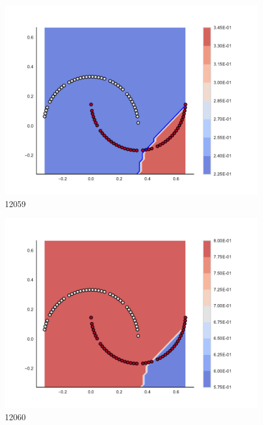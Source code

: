 \begin{subfigure}[b]{0.09\textwidth}
    \includegraphics[clip, trim=2.35cm 1.75cm 4.5cm 0cm,width=\textwidth]{img/convergence/12059.pdf}
    \caption{12059}
    \label{fig:convergence_12059}
\end{subfigure}
%
\begin{subfigure}[b]{0.09\textwidth}
    \includegraphics[clip, trim=2.35cm 1.75cm 4.5cm 0cm,width=\textwidth]{img/convergence/12060.pdf}
    \caption{12060}
    \label{fig:convergence_12060}
\end{subfigure}
%
